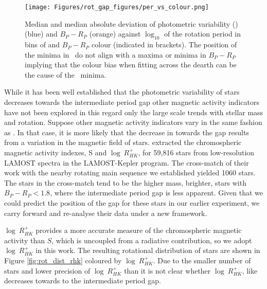 \begin{figure}
\centering
    \texttt{[image: Figures/rot\_gap\_figures/per\_vs\_colour.png]}
    \caption{
    Median and median absolute deviation of photometric variability (\rper{}) (blue) and $B_P-R_P$ (orange) against $\log_10$ of the rotation period in bins of and \gaia{} $B_P-R_P$ colour (indicated in brackets). The position of the minima in \rper{} \ do not align with a maxima or minima in $B_P-R_P$ implying that the colour bias when fitting across the dearth can be the cause of the \rper{} \ minima.}
    \label{fig:colour_rper}
\end{figure}

While it has been well established that the photometric variability of stars decreases towards the intermediate period gap other magnetic activity indicators have not been explored in this regard only the large scale trends with stellar mass and rotation.
Suppose other magnetic activity indicators vary in the same fashion as \rper{}. 
In that case, it is more likely that the decrease in \rper{} towards the gap results from a variation in the magnetic field of stars.
\citet{zhang_magnetic_2020} extracted the chromospheric magnetic activity indexes, S and $\log \ R^{+}_{HK}$, for 59,816 stars from low-resolution LAMOST spectra in the LAMOST-Kepler program.
The cross-match of their work with the nearby rotating main sequence we established yielded 1060 stars.
The stars in the cross-match tend to be the higher mass, brighter, stars with $B_P-R_P<1.8$, where the intermediate period gap is less apparent.
Given that we could predict the position of the gap for these stars in our earlier experiment, we carry forward and re-analyse their data under a new framework.

$\log \ R^{+}_{HK}$ provides a more accurate measure of the chromospheric magnetic activity than $S$, which is uncoupled from a radiative contribution, so we adopt $\log \ R^{+}_{HK}$ in this work.
The resulting rotational distribution of stars are shown in Figure \ref{fig:rot_dist_rhk} coloured by $\log \ R^{+}_{HK}$.
Due to the smaller number of stars and lower precision of $\log \ R^{+}_{HK}$ than \rper{} it is not clear whether $\log \ R^{+}_{HK}$, like \rper{} decreases towards to the intermediate period gap.

